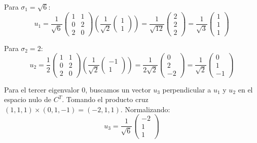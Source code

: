 \documentclass[12pt]{article}
\begin{document}
Para $\sigma_1 = \sqrt{6}$:
\begin{equation}
    u_1 = \frac{1}{\sqrt{6}} \begin{pmatrix} 1 & 1 \\ 0 & 2 \\ 2 & 0 \end{pmatrix} \left( \frac{1}{\sqrt{2}}\begin{pmatrix} 1 \\ 1 \end{pmatrix} \right) = \frac{1}{\sqrt{12}} \begin{pmatrix} 2 \\ 2 \\ 2 \end{pmatrix} = \frac{1}{\sqrt{3}} \begin{pmatrix} 1 \\ 1 \\ 1 \end{pmatrix}
\end{equation}

Para $\sigma_2 = 2$:
\begin{equation}
    u_2 = \frac{1}{2} \begin{pmatrix} 1 & 1 \\ 0 & 2 \\ 2 & 0 \end{pmatrix} \left( \frac{1}{\sqrt{2}}\begin{pmatrix} -1 \\ 1 \end{pmatrix} \right) = \frac{1}{2\sqrt{2}} \begin{pmatrix} 0 \\ 2 \\ -2 \end{pmatrix} = \frac{1}{\sqrt{2}} \begin{pmatrix} 0 \\ 1 \\ -1 \end{pmatrix}
\end{equation}

Para el tercer eigenvalor $0$, buscamos un vector $u_3$ perpendicular a $u_1$ y $u_2$ en el espacio nulo de $C^T$. Tomando el producto cruz $(1,1,1) \times (0,1,-1) = (-2, 1, 1)$. Normalizando:
\begin{equation}
    u_3 = \frac{1}{\sqrt{6}} \begin{pmatrix} -2 \\ 1 \\ 1 \end{pmatrix}
\end{equation}
\end{document}
